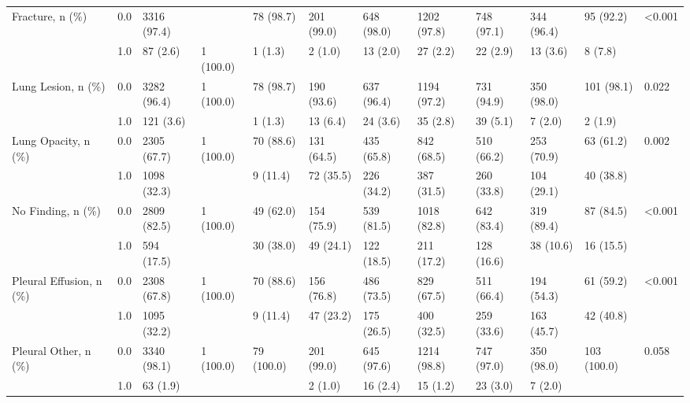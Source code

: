 \begin{tabular}{llllllllllll}
Fracture, n (\%) & 0.0 &           3316 (97.4) &            &   78 (98.7) &  201 (99.0) &  648 (98.0) &  1202 (97.8) &  748 (97.1) &  344 (96.4) &    95 (92.2) &  <0.001 \\
                       & 1.0 &              87 (2.6) &  1 (100.0) &     1 (1.3) &     2 (1.0) &    13 (2.0) &     27 (2.2) &    22 (2.9) &    13 (3.6) &      8 (7.8) &         \\
Lung Lesion, n (\%) & 0.0 &           3282 (96.4) &  1 (100.0) &   78 (98.7) &  190 (93.6) &  637 (96.4) &  1194 (97.2) &  731 (94.9) &  350 (98.0) &   101 (98.1) &   0.022 \\
                       & 1.0 &             121 (3.6) &            &     1 (1.3) &    13 (6.4) &    24 (3.6) &     35 (2.8) &    39 (5.1) &     7 (2.0) &      2 (1.9) &         \\
Lung Opacity, n (\%) & 0.0 &           2305 (67.7) &  1 (100.0) &   70 (88.6) &  131 (64.5) &  435 (65.8) &   842 (68.5) &  510 (66.2) &  253 (70.9) &    63 (61.2) &   0.002 \\
                       & 1.0 &           1098 (32.3) &            &    9 (11.4) &   72 (35.5) &  226 (34.2) &   387 (31.5) &  260 (33.8) &  104 (29.1) &    40 (38.8) &         \\
No Finding, n (\%) & 0.0 &           2809 (82.5) &  1 (100.0) &   49 (62.0) &  154 (75.9) &  539 (81.5) &  1018 (82.8) &  642 (83.4) &  319 (89.4) &    87 (84.5) &  <0.001 \\
                       & 1.0 &            594 (17.5) &            &   30 (38.0) &   49 (24.1) &  122 (18.5) &   211 (17.2) &  128 (16.6) &   38 (10.6) &    16 (15.5) &         \\
Pleural Effusion, n (\%) & 0.0 &           2308 (67.8) &  1 (100.0) &   70 (88.6) &  156 (76.8) &  486 (73.5) &   829 (67.5) &  511 (66.4) &  194 (54.3) &    61 (59.2) &  <0.001 \\
                       & 1.0 &           1095 (32.2) &            &    9 (11.4) &   47 (23.2) &  175 (26.5) &   400 (32.5) &  259 (33.6) &  163 (45.7) &    42 (40.8) &         \\
Pleural Other, n (\%) & 0.0 &           3340 (98.1) &  1 (100.0) &  79 (100.0) &  201 (99.0) &  645 (97.6) &  1214 (98.8) &  747 (97.0) &  350 (98.0) &  103 (100.0) &   0.058 \\
                       & 1.0 &              63 (1.9) &            &             &     2 (1.0) &    16 (2.4) &     15 (1.2) &    23 (3.0) &     7 (2.0) &              &         \\

\end{tabular}
